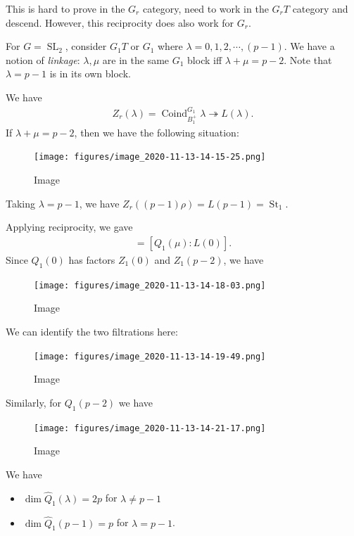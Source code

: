 \begin{remark}

This is hard to prove in the \(G_r\) category, need to work in the
\(G_r T\) category and descend. However, this reciprocity does also work
for \(G_r\).

\end{remark}

\begin{example}[?]

For \(G = {\operatorname{SL}}_2\), consider \(G_1 T\) or \(G_1\) where
\(\lambda = 0,1,2,\cdots, (p-1)\). We have a notion of \emph{linkage}:
\(\lambda, \mu\) are in the same \(G_1\) block iff
\(\lambda + \mu = p-2\). Note that \(\lambda = p-1\) is in its own
block.

We have
\begin{align*}  
Z_r(\lambda) = \operatorname{Coind}_{B_1^+}^{G_1} \lambda \twoheadrightarrow L(\lambda)
.\end{align*}
If \(\lambda + \mu = p-2\), then we have the following situation:

\begin{figure}
\centering
\texttt{[image: figures/image\_2020-11-13-14-15-25.png]}
\caption{Image}
\end{figure}

Taking \(\lambda = p-1\), we have
\(Z_r((p-1)\rho) = L(p-1) = \operatorname{St}_1\).

Applying reciprocity, we gave
\begin{align*}  
[Q_1(0) : Q_1(\mu)] = [Q_1(\mu): L(0)]
.\end{align*}
Since \(Q_1(0)\) has factors \(Z_1(0)\) and \(Z_1(p-2)\), we have

\begin{figure}
\centering
\texttt{[image: figures/image\_2020-11-13-14-18-03.png]}
\caption{Image}
\end{figure}

We can identify the two filtrations here:

\begin{figure}
\centering
\texttt{[image: figures/image\_2020-11-13-14-19-49.png]}
\caption{Image}
\end{figure}

Similarly, for \(Q_1(p-2)\) we have

\begin{figure}
\centering
\texttt{[image: figures/image\_2020-11-13-14-21-17.png]}
\caption{Image}
\end{figure}

We have

\begin{itemize}
\item
  \(\dim \widehat{Q}_1(\lambda) = 2p\) for \(\lambda \neq p-1\)
\item
  \(\dim \widehat{Q}_1(p-1) = p\) for \(\lambda = p-1\).
\end{itemize}

\end{example}


